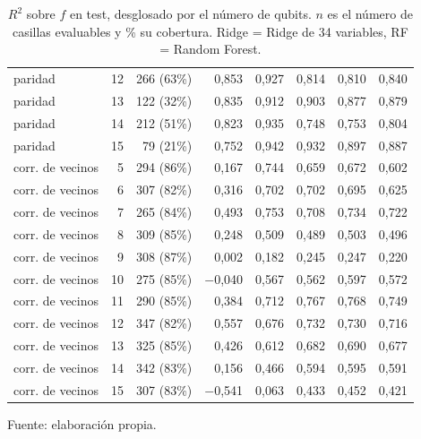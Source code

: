 \begin{table}[htbp]
{\begin{tabular}{@{}lrrrrrrr@{}}
        paridad & 12 & 266 (63\%) & 0,853 & 0,927 & 0,814 & 0,810 & 0,840 \\
        paridad & 13 & 122 (32\%) & 0,835 & 0,912 & 0,903 & 0,877 & 0,879 \\
        paridad & 14 & 212 (51\%) & 0,823 & 0,935 & 0,748 & 0,753 & 0,804 \\
        paridad & 15 & 79 (21\%) & 0,752 & 0,942 & 0,932 & 0,897 & 0,887 \\
        corr. de vecinos & 5 & 294 (86\%) & 0,167 & 0,744 & 0,659 & 0,672 & 0,602 \\
        corr. de vecinos & 6 & 307 (82\%) & 0,316 & 0,702 & 0,702 & 0,695 & 0,625 \\
        corr. de vecinos & 7 & 265 (84\%) & 0,493 & 0,753 & 0,708 & 0,734 & 0,722 \\
        corr. de vecinos & 8 & 309 (85\%) & 0,248 & 0,509 & 0,489 & 0,503 & 0,496 \\
        corr. de vecinos & 9 & 308 (87\%) & 0,002 & 0,182 & 0,245 & 0,247 & 0,220 \\
        corr. de vecinos & 10 & 275 (85\%) & $-$0,040 & 0,567 & 0,562 & 0,597 & 0,572 \\
        corr. de vecinos & 11 & 290 (85\%) & 0,384 & 0,712 & 0,767 & 0,768 & 0,749 \\
        corr. de vecinos & 12 & 347 (82\%) & 0,557 & 0,676 & 0,732 & 0,730 & 0,716 \\
        corr. de vecinos & 13 & 325 (85\%) & 0,426 & 0,612 & 0,682 & 0,690 & 0,677 \\
        corr. de vecinos & 14 & 342 (83\%) & 0,156 & 0,466 & 0,594 & 0,595 & 0,591 \\
        corr. de vecinos & 15 & 307 (83\%) & $-$0,541 & 0,063 & 0,433 & 0,452 & 0,421 \\
        \bottomrule
    \end{tabular}}

    \caption{$R^2$ sobre $f$ en test, desglosado por el número de qubits. $n$ es el número de casillas evaluables y \% su cobertura. Ridge = Ridge de 34 variables, RF = Random Forest.}
    \label{tab:v3_tamano_r2}

    {\footnotesize Fuente: elaboración propia.}
\end{table}
